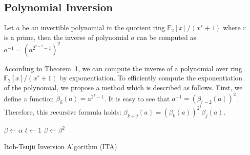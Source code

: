 \documentclass[runningheads]{llncs}
\begin{document}
\subsection{Polynomial Inversion}
\label{sub::inversion}
\begin{theorem}
Let $a$ be an invertible polynomial in the quotient ring $\mathbb{F}_2[x]/(x^r+1)$ where $r$ is a prime, then the inverse of polynomial $a$ can be computed as $a^{-1}=(a^{2^{r-2}-1})^2$
\end{theorem}
%
According to Theorem~1, we can compute the inverse of a
polynomial over ring $\mathbb{F}_2[x]/(x^r+1)$
by exponentiation.
To efficiently compute the exponentiation of the polynomial,
we propose a method which is described as follows.
First, we define a function $\beta_{k}(a)=a^{2^k-1}$.
It is easy to see that $a^{-1}=(\beta_{r-2}(a))^2$. %
Therefore, this recursive
formula holds:
$\beta_{k+j}(a)=(\beta_{k}(a))^{2^j}\beta_{j}(a)$.
%
\begin{algorithm}[!tb]
\DontPrintSemicolon %
$\beta \gets \alpha$ \;
$t \gets 1$ \;
 $\beta \gets \beta ^2$ \;
\Return {$\beta$}


\caption{Itoh-Tsujii Inversion Algorithm (ITA) \cite{hu2015fast}}
\label{algo:ITA}
\end{algorithm}
\end{document}
